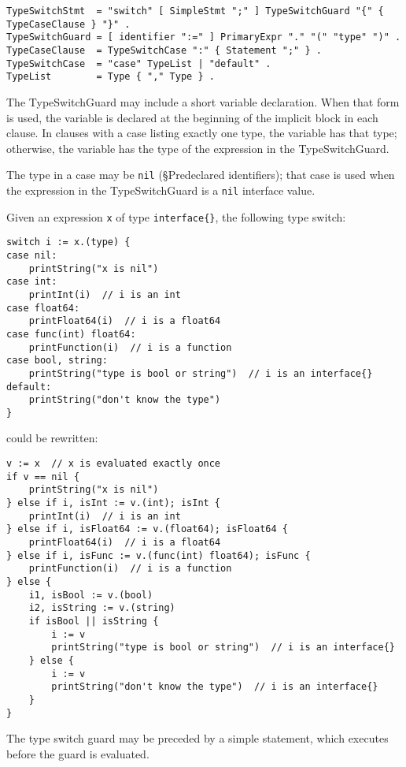 \begin{Verbatim}[frame=single]
TypeSwitchStmt  = "switch" [ SimpleStmt ";" ] TypeSwitchGuard "{" { TypeCaseClause } "}" .
TypeSwitchGuard = [ identifier ":=" ] PrimaryExpr "." "(" "type" ")" .
TypeCaseClause  = TypeSwitchCase ":" { Statement ";" } .
TypeSwitchCase  = "case" TypeList | "default" .
TypeList        = Type { "," Type } .
\end{Verbatim}

The TypeSwitchGuard may include a
short variable declaration.
When that form is used, the variable is declared at the beginning of the
implicit block in each clause. In clauses with a case
listing exactly one type, the variable has that type; otherwise, the
variable has the type of the expression in the TypeSwitchGuard.

The type in a case may be \texttt{nil}
(§Predeclared identifiers); that
case is used when the expression in the TypeSwitchGuard is a
\texttt{nil} interface value.

Given an expression \texttt{x} of type \texttt{interface\{\}}, the
following type switch:

\begin{Verbatim}[frame=single]
switch i := x.(type) {
case nil:
    printString("x is nil")
case int:
    printInt(i)  // i is an int
case float64:
    printFloat64(i)  // i is a float64
case func(int) float64:
    printFunction(i)  // i is a function
case bool, string:
    printString("type is bool or string")  // i is an interface{}
default:
    printString("don't know the type")
}
\end{Verbatim}

could be rewritten:

\begin{Verbatim}[frame=single]
v := x  // x is evaluated exactly once
if v == nil {
    printString("x is nil")
} else if i, isInt := v.(int); isInt {
    printInt(i)  // i is an int
} else if i, isFloat64 := v.(float64); isFloat64 {
    printFloat64(i)  // i is a float64
} else if i, isFunc := v.(func(int) float64); isFunc {
    printFunction(i)  // i is a function
} else {
    i1, isBool := v.(bool)
    i2, isString := v.(string)
    if isBool || isString {
        i := v
        printString("type is bool or string")  // i is an interface{}
    } else {
        i := v
        printString("don't know the type")  // i is an interface{}
    }
}
\end{Verbatim}

The type switch guard may be preceded by a simple statement, which
executes before the guard is evaluated.

